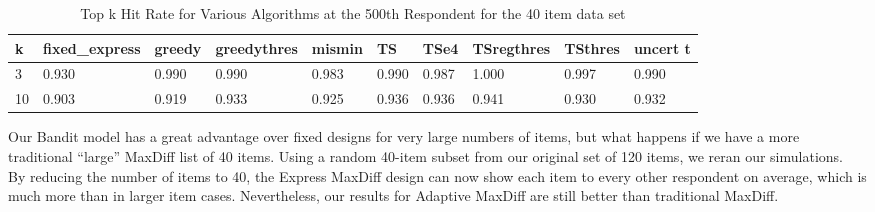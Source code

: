 \documentclass[nonblindrev]{informs3}
\begin{document}
\begin{table}
\begin{center}
\begin{tabular}{llllllllll}
\hline   k &  fixed\_express &  greedy &  greedythres &  mismin &    TS &  TSe4 &  TSregthres &  TSthres &  uncert t \\\hline    3 &          0.930 &   0.990 &        0.990 &   0.983 & 0.990 & 0.987 &       1.000 &    0.997 &   0.990 \\  10 &          0.903 &   0.919 &        0.933 &   0.925 & 0.936 & 0.936 &       0.941 &    0.930 &   0.932 \end{tabular}
\end{center}
\caption{Top k Hit Rate for Various Algorithms at the 500th Respondent for the 40 item data set}
\label{table:40at500}
\end{table}
Our Bandit model has a great advantage over fixed designs for very large numbers of items, but what happens if we have a more traditional ``large'' MaxDiff list of 40 items. Using a random 40-item subset from our original set of 120 items, we reran our simulations. \\
By reducing the number of items to 40, the Express MaxDiff design can now show each item to every other respondent on average, which is much more than in larger item cases.
Nevertheless, our results for Adaptive MaxDiff are still better than traditional MaxDiff.
\end{document}
